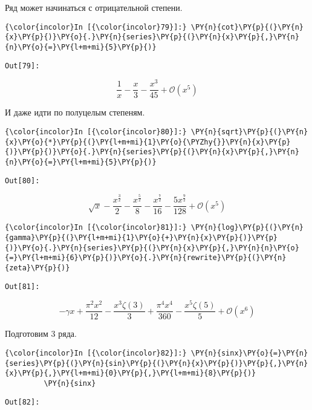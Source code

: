     Ряд может начинаться с отрицательной степени.

    \begin{Verbatim}[commandchars=\\\{\}]
{\color{incolor}In [{\color{incolor}79}]:} \PY{n}{cot}\PY{p}{(}\PY{n}{x}\PY{p}{)}\PY{o}{.}\PY{n}{series}\PY{p}{(}\PY{n}{x}\PY{p}{,}\PY{n}{n}\PY{o}{=}\PY{l+m+mi}{5}\PY{p}{)}
\end{Verbatim}
\texttt{\color{outcolor}Out[{\color{outcolor}79}]:}
    
    \[\frac{1}{x} - \frac{x}{3} - \frac{x^{3}}{45} + \mathcal{O}\left(x^{5}\right)\]

    

    И даже идти по полуцелым степеням.

    \begin{Verbatim}[commandchars=\\\{\}]
{\color{incolor}In [{\color{incolor}80}]:} \PY{n}{sqrt}\PY{p}{(}\PY{n}{x}\PY{o}{*}\PY{p}{(}\PY{l+m+mi}{1}\PY{o}{\PYZhy{}}\PY{n}{x}\PY{p}{)}\PY{p}{)}\PY{o}{.}\PY{n}{series}\PY{p}{(}\PY{n}{x}\PY{p}{,}\PY{n}{n}\PY{o}{=}\PY{l+m+mi}{5}\PY{p}{)}
\end{Verbatim}
\texttt{\color{outcolor}Out[{\color{outcolor}80}]:}
    
    \[\sqrt{x} - \frac{x^{\frac{3}{2}}}{2} - \frac{x^{\frac{5}{2}}}{8} - \frac{x^{\frac{7}{2}}}{16} - \frac{5 x^{\frac{9}{2}}}{128} + \mathcal{O}\left(x^{5}\right)\]

    

    \begin{Verbatim}[commandchars=\\\{\}]
{\color{incolor}In [{\color{incolor}81}]:} \PY{n}{log}\PY{p}{(}\PY{n}{gamma}\PY{p}{(}\PY{l+m+mi}{1}\PY{o}{+}\PY{n}{x}\PY{p}{)}\PY{p}{)}\PY{o}{.}\PY{n}{series}\PY{p}{(}\PY{n}{x}\PY{p}{,}\PY{n}{n}\PY{o}{=}\PY{l+m+mi}{6}\PY{p}{)}\PY{o}{.}\PY{n}{rewrite}\PY{p}{(}\PY{n}{zeta}\PY{p}{)}
\end{Verbatim}
\texttt{\color{outcolor}Out[{\color{outcolor}81}]:}
    
    \[- \gamma x + \frac{\pi^{2} x^{2}}{12} - \frac{x^{3} \zeta\left(3\right)}{3} + \frac{\pi^{4} x^{4}}{360} - \frac{x^{5} \zeta\left(5\right)}{5} + \mathcal{O}\left(x^{6}\right)\]

    

    Подготовим 3 ряда.

    \begin{Verbatim}[commandchars=\\\{\}]
{\color{incolor}In [{\color{incolor}82}]:} \PY{n}{sinx}\PY{o}{=}\PY{n}{series}\PY{p}{(}\PY{n}{sin}\PY{p}{(}\PY{n}{x}\PY{p}{)}\PY{p}{,}\PY{n}{x}\PY{p}{,}\PY{l+m+mi}{0}\PY{p}{,}\PY{l+m+mi}{8}\PY{p}{)}
         \PY{n}{sinx}
\end{Verbatim}
\texttt{\color{outcolor}Out[{\color{outcolor}82}]:}
    
